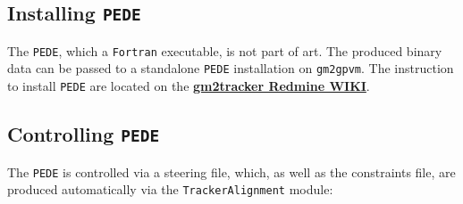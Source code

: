 \documentclass[12pt]{article}
\begin{document}
\subsection{Installing \texttt{PEDE}} 
The \texttt{PEDE}, which a \texttt{Fortran} executable, is not part of art. The produced binary data can be passed to a standalone \texttt{PEDE} installation on \texttt{gm2gpvm}. The instruction to install \texttt{PEDE} are located on the \textbf{\href{https://cdcvs.fnal.gov/redmine/projects/gm2tracker/wiki/Tracker_Alignment_MC_with_Millipede_II_Framework}{gm2tracker Redmine WIKI}}. 

\subsection{Controlling \texttt{PEDE}} 
The \texttt{PEDE} is controlled via a steering file, which, as well as the constraints file, are produced automatically via the \verb!TrackerAlignment! module:

\clearpage
\end{document}
